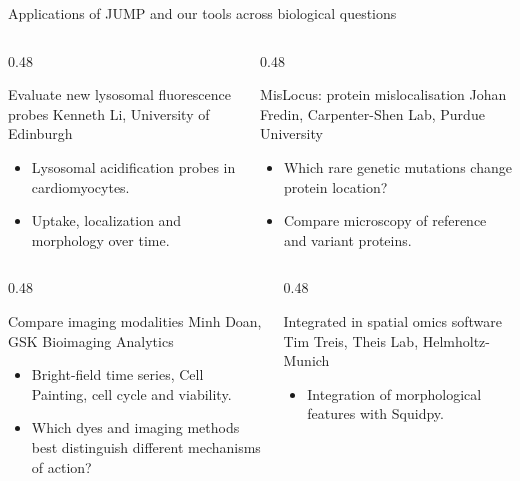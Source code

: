 \documentclass[aspectratio=169,10pt]{beamer}
\begin{document}
\begin{frame}[label={sec:org0000013}]{Applications of JUMP and our tools across biological questions}
\begin{columns}[T,onlytextwidth]
\begin{column}{0.48\textwidth}
\begin{block}{Evaluate new lysosomal fluorescence probes}
\small Kenneth Li, University of Edinburgh\par
\begin{itemize}
\item Lysosomal acidification probes in cardiomyocytes.
\item Uptake, localization and morphology over time.
\end{itemize}
\end{block}
\end{column}
\begin{column}{0.48\textwidth}
\begin{block}{MisLocus: protein mislocalisation}
\small Johan Fredin, Carpenter-Shen Lab, Purdue University\par
\begin{itemize}
\item Which rare genetic mutations change protein location?
\item Compare microscopy of reference and variant proteins.
\end{itemize}
\end{block}
\end{column}
\end{columns}
\begin{columns}[T,onlytextwidth]
\begin{column}{0.48\textwidth}
\begin{block}{Compare imaging modalities}
\small Minh Doan, GSK Bioimaging Analytics\par
\begin{itemize}
\item Bright-field time series, Cell Painting, cell cycle and viability.
\item Which dyes and imaging methods best distinguish different mechanisms of action?
\end{itemize}
\end{block}
\end{column}
\begin{column}{0.48\textwidth}
\begin{block}{Integrated in spatial omics software}
\small Tim Treis, Theis Lab, Helmholtz-Munich\par
\begin{itemize}
\item Integration of morphological features with Squidpy.
\end{itemize}
\end{block}
\end{column}
\end{columns}
\end{frame}
\end{document}
